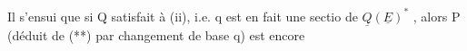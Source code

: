 Il s'ensui que si Q satisfait à (ii), i.e.  q est en fait une sectio
de $\underline{Q}(\underline{E})^*$ , alors P (déduit de (**) par  changement de base q) est encore

